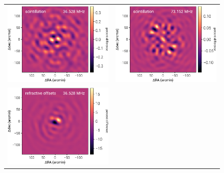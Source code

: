 \documentclass[twocolumn]{aastex61}
\begin{document}
\begin{figure}[t]
    \centering
    \begin{tabular}{cc}
        \includegraphics[width=\columnwidth]{figures/ionospheric-simulations/scintillation-4} &
        \includegraphics[width=\columnwidth]{figures/ionospheric-simulations/scintillation-18} \\
        \includegraphics[width=\columnwidth]{figures/ionospheric-simulations/refraction-4} &

\end{tabular}
\end{figure}
\end{document}
